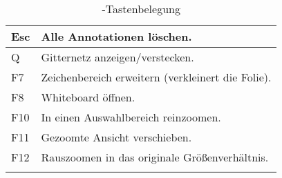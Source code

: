 \begin{longtable}{|p{}|l|}
	\hline
	Esc & Alle Annotationen löschen.\\
	\hline
	Q & Gitternetz anzeigen/verstecken.\\
	\hline
	F7 & Zeichenbereich erweitern (verkleinert die Folie).\\
	\hline
	F8 & Whiteboard öffnen.\\
	\hline
	F10 & In einen Auswahlbereich reinzoomen.\\
	\hline
	F11 & Gezoomte Ansicht verschieben.\\
	\hline
	F12 & Rauszoomen in das originale Größenverhältnis.\\
	\hline
	\caption{\lectPresenter{}-Tastenbelegung}
	\label{tab:shortcuts}
\end{longtable}

\pagebreak